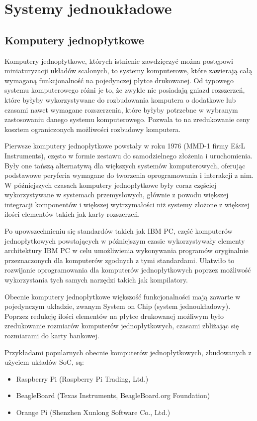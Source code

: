 \section{Systemy jednoukładowe}

\subsection{Komputery jednopłytkowe}

Komputery jednopłytkowe, których istnienie zawdzięczyć można postępowi miniaturyzacji układów scalonych, to systemy komputerowe, które zawierają całą wymaganą funkcjonalność na pojedynczej płytce drukowanej. Od typowego systemu komputerowego różni je to, że zwykle nie posiadają gniazd rozszerzeń, które byłyby wykorzystywane do rozbudowania komputera o dodatkowe lub czasami nawet wymagane rozszerzenia, które byłyby potrzebne w wybranym zastosowaniu danego systemu komputerowego. Pozwala to na zredukowanie ceny kosztem ograniczonych możliwości rozbudowy komputera.

Pierwsze komputery jednopłytkowe powstały w roku 1976 (MMD-1 firmy E\&L Instruments), często w formie zestawu do samodzielnego złożenia i uruchomienia. Były one tańszą alternatywą dla większych systemów komputerowych, oferując podstawowe peryferia wymagane do tworzenia oprogramowania i interakcji z nim.
W późniejszych czasach komputery jednopłytkowe były coraz częściej wykorzystywane w systemach przemysłowych, głównie z powodu większej integracji komponentów i większej wytrzymałości niż systemy złożone z większej ilości elementów takich jak karty rozszerzeń.

Po upowszechnieniu się standardów takich jak IBM PC, część komputerów jednopłytkowych powstających w późniejszym czasie wykorzystywały elementy architektury IBM PC w celu umożliwienia wykonywania programów oryginalnie przeznaczonych dla komputerów zgodnych z tymi standardami. Ułatwiło to rozwijanie oprogramowania dla komputerów jednopłytkowych poprzez możliwość wykorzystania tych samych narzędzi takich jak kompilatory.

Obecnie komputery jednopłytkowe większość funkcjonalności mają zawarte w pojedynczym układzie, zwanym System on Chip (system jednoukładowy). Poprzez redukcję ilości elementów na płytce drukowanej możliwym było zredukowanie rozmiarów komputerów jednopłytkowych, czasami zbliżając się rozmiarami do karty bankowej.

Przykładami popularnych obecnie komputerów jednopłytkowych, zbudowanych z użyciem układów SoC, są:
\begin{itemize}
	\item Raspberry Pi (Raspberry Pi Trading, Ltd.)
	\item BeagleBoard (Texas Instruments, BeagleBoard.org Foundation)
	\item Orange Pi (Shenzhen Xunlong Software Co., Ltd.)
\end{itemize}

